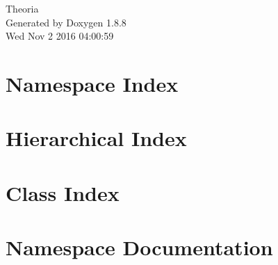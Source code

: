 \documentclass[twoside]{book}
\newcommand{\+}{\discretionary{\mbox{\scriptsize$\hookleftarrow$}}{}{}}
\newcommand{\clearemptydoublepage}{%
  \newpage{\pagestyle{empty}\cleardoublepage}%
}
\begin{document}
\hypersetup{pageanchor=false,
             bookmarks=true,
             bookmarksnumbered=true,
             pdfencoding=unicode
            }
\begin{titlepage}
\vspace*{7cm}
\begin{center}%
{\Large Theoria }\\
\vspace*{1cm}
{\large Generated by Doxygen 1.8.8}\\
\vspace*{0.5cm}
{\small Wed Nov 2 2016 04:00:59}\\
\end{center}
\end{titlepage}
\clearemptydoublepage
\tableofcontents
\clearemptydoublepage
{}
\hypersetup{pageanchor=true}

\chapter{Namespace Index}

\chapter{Hierarchical Index}

\chapter{Class Index}

\chapter{Namespace Documentation}

\end{document}
